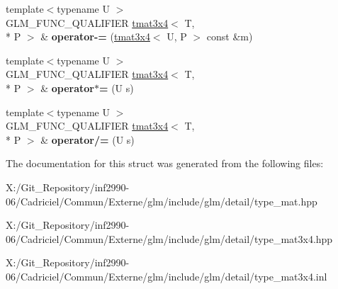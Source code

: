 \begin{DoxyCompactItemize}
\item 
\hypertarget{structglm_1_1detail_1_1tmat3x4_ab293ffba697e138783137b5a0961afdf}{{\footnotesize template$<$typename U $>$ }\\G\-L\-M\-\_\-\-F\-U\-N\-C\-\_\-\-Q\-U\-A\-L\-I\-F\-I\-E\-R \hyperlink{structglm_1_1detail_1_1tmat3x4}{tmat3x4}$<$ T, \\*
P $>$ \& {\bfseries operator-\/=} (\hyperlink{structglm_1_1detail_1_1tmat3x4}{tmat3x4}$<$ U, P $>$ const \&m)}\label{structglm_1_1detail_1_1tmat3x4_ab293ffba697e138783137b5a0961afdf}

\item 
\hypertarget{structglm_1_1detail_1_1tmat3x4_a329a90caa5d646b47ad7af4fdd657e95}{{\footnotesize template$<$typename U $>$ }\\G\-L\-M\-\_\-\-F\-U\-N\-C\-\_\-\-Q\-U\-A\-L\-I\-F\-I\-E\-R \hyperlink{structglm_1_1detail_1_1tmat3x4}{tmat3x4}$<$ T, \\*
P $>$ \& {\bfseries operator$\ast$=} (U s)}\label{structglm_1_1detail_1_1tmat3x4_a329a90caa5d646b47ad7af4fdd657e95}

\item 
\hypertarget{structglm_1_1detail_1_1tmat3x4_aa6519a6c5e446e309ad26f609fdb9a74}{{\footnotesize template$<$typename U $>$ }\\G\-L\-M\-\_\-\-F\-U\-N\-C\-\_\-\-Q\-U\-A\-L\-I\-F\-I\-E\-R \hyperlink{structglm_1_1detail_1_1tmat3x4}{tmat3x4}$<$ T, \\*
P $>$ \& {\bfseries operator/=} (U s)}\label{structglm_1_1detail_1_1tmat3x4_aa6519a6c5e446e309ad26f609fdb9a74}

\end{DoxyCompactItemize}


The documentation for this struct was generated from the following files\-:\begin{DoxyCompactItemize}
\item 
X\-:/\-Git\-\_\-\-Repository/inf2990-\/06/\-Cadriciel/\-Commun/\-Externe/glm/include/glm/detail/type\-\_\-mat.\-hpp\item 
X\-:/\-Git\-\_\-\-Repository/inf2990-\/06/\-Cadriciel/\-Commun/\-Externe/glm/include/glm/detail/type\-\_\-mat3x4.\-hpp\item 
X\-:/\-Git\-\_\-\-Repository/inf2990-\/06/\-Cadriciel/\-Commun/\-Externe/glm/include/glm/detail/type\-\_\-mat3x4.\-inl\end{DoxyCompactItemize}
